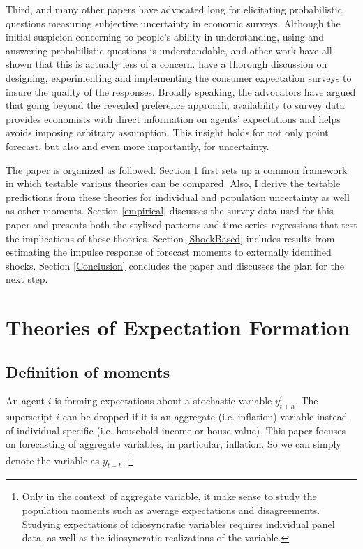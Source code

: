 \documentclass[12pt]{article}
\begin{document}
	Third, \citet{manski2004measuring} and many other papers have advocated long for elicitating probabilistic questions measuring subjective uncertainty in economic surveys. Although the initial suspicion concerning to people's ability in understanding, using and answering probabilistic questions is understandable, \citet{bertrand2001people} and other work have all shown that this is actually less of a concern. \citet{armantier2017overview} have a thorough discussion on designing, experimenting and implementing the consumer expectation surveys to insure the quality of the responses. Broadly speaking, the advocators have argued that going beyond the revealed preference approach, availability to survey data provides economists with direct information on agents' expectations and helps avoids imposing arbitrary assumption.  This insight holds for not only point forecast, but also and even more importantly, for uncertainty.
	
	The paper is organized as followed. Section \ref{theory} first sets up a common framework in which testable various theories can be compared. Also, I derive the testable predictions from these theories for individual and population uncertainty as well as other moments. Section \ref{empirical} discusses the survey data used for this paper and presents both the stylized patterns and time series regressions that test the implications of these theories.   Section \ref{ShockBased} includes results from estimating the impulse response of forecast moments to externally identified shocks.  Section \ref{Conclusion} concludes the paper and discusses the plan for the next step. 
	
	\section{Theories of Expectation Formation}\label{theory}
	
	\subsection{Definition of moments}
	
	An agent $i$ is forming expectations about a stochastic variable $y^i_{t+h}$. The superscript $i$ can be dropped if it is an aggregate (i.e. inflation) variable instead of individual-specific  (i.e. household income or house value). This paper focuses on forecasting of aggregate variables, in particular, inflation. So we can simply denote the variable as $y_{t+h}$.  \footnote{Only in the context of aggregate variable, it make sense to study the population moments such as average expectations and disagreements. Studying expectations of idiosyncratic variables requires individual panel data, as well as the idiosyncratic realizations of the variable. }
	
\end{document}

